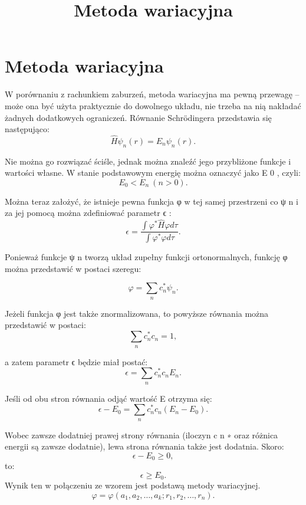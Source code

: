 \documentclass{article}
\begin{document}
\title{Metoda wariacyjna}
\maketitle

\section{Metoda wariacyjna}
W porównaniu z rachunkiem zaburzeń, metoda wariacyjna ma pewną przewagę – może ona być użyta praktycznie do dowolnego układu, nie trzeba na nią nakładać żadnych dodatkowych ograniczeń. Równanie Schrödingera przedstawia się następująco: 
$${ {\hat {H}}\psi _{n}(r)=E_{n}\psi _{n}(r).}$$

Nie można go rozwiązać ściśle, jednak można znaleźć jego przybliżone funkcje i wartości własne. W stanie podstawowym energię można oznaczyć jako E 0 , czyli:
$${ E_{0}<E_{n}~(n>0).}$$

Można teraz założyć, że istnieje pewna funkcja φ  w tej samej przestrzeni co ψ n  i za jej pomocą można zdefiniować parametr ϵ :
$${ \epsilon ={\frac {\int \varphi ^{*}{\hat {H}}\varphi d\tau }{\int \varphi ^{*}\varphi d\tau }}.}$$

Ponieważ funkcje ψ n tworzą układ zupełny funkcji ortonormalnych, funkcję φ  można przedstawić w postaci szeregu:

$${ \varphi =\sum \limits _{n}c_{n}^{*}\psi _{n}.}$$

Jeżeli funkcja φ jest także znormalizowana, to powyższe równania można przedstawić w postaci: 
$${ \sum \limits _{n}c_{n}^{*}c_{n}=1,}$$

a zatem parametr ϵ będzie miał postać: 
$${ \epsilon =\sum \limits _{n}c_{n}^{*}c_{n}E_{n}.}$$

Jeśli od obu stron równania odjąć wartość E otrzyma się: 
$${ \epsilon -E_{0}=\sum \limits _{n}c_{n}^{*}c_{n}(E_{n}-E_{0}).}$$

Wobec zawsze dodatniej prawej strony równania (iloczyn c n ∗ oraz różnica energii są zawsze dodatnie), lewa strona równania także jest dodatnia. Skoro:
$${ \epsilon -E_{0}\geqslant 0,}$$
to: 
$${ \epsilon \geqslant E_{0}.}$$
Wynik ten w połączeniu ze wzorem jest podstawą metody wariacyjnej. 
$${ \varphi =\varphi (a_{1},a_{2},\dots ,a_{k};r_{1},r_{2},\dots ,r_{n}).}$$
\end{document}
